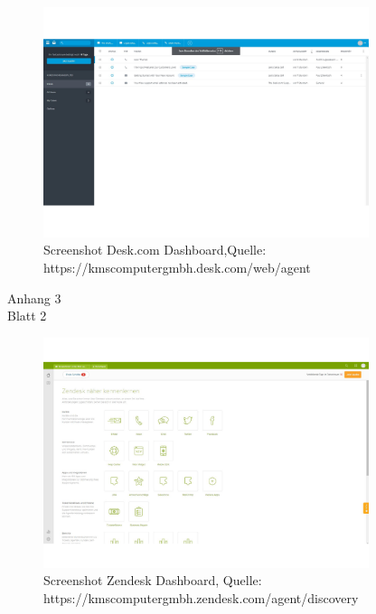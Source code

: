 \begin{figure}[h!]
\includegraphics[width=0.85\textwidth]{Abbildungen/Deskcom.pdf}
\caption*{Screenshot Desk.com Dashboard,Quelle: https://kmscomputergmbh.desk.com/web/agent}
\label{Deskcom}
\end{figure}

\newpage

\begin{flushright}
Anhang 3\\
Blatt 2\\
\label{Anhang3_2}
\end{flushright}


\begin{figure}[h!]
\includegraphics[width=0.85\textwidth]{Abbildungen/Zendesk.pdf}
\caption*{Screenshot Zendesk Dashboard, \newline
Quelle: https://kmscomputergmbh.zendesk.com/agent/discovery}
\label{Zendesk}
\end{figure}


